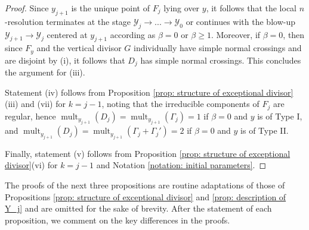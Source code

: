 \documentclass[12pt]{amsart}
\numberwithin{equation}{section}
\theoremstyle{definition}
\newcommand{\Y}{\mathcal{Y}}
\DeclareMathOperator{\mult}{mult}
\begin{document}
\begin{proof}
    Since $y_{j+1}$ is the unique point of $F_j$ lying over $y$, it follows that the local $n$-resolution terminates at the stage $\Y_j\to...\to\Y_0$ or continues with the blow-up $\Y_{j+1}\to\Y_j$ centered at $y_{j+1}$ according as $\beta=0$ or $\beta\geq 1$. Moreover, if $\beta=0$, then since $F_y$ and the vertical divisor $G$ individually have simple normal crossings and are disjoint by (i), it follows that $D_j$ has simple normal crossings. This concludes the argument for (iii).
    
    Statement (iv) follows from Proposition \ref{prop: structure of exceptional divisor}(iii) and (vii) for $k=j-1$, noting that the irreducible components of $F_j$ are regular, hence $\mult_{y_{j+1}}(D_j)=\mult_{y_{j+1}}(\Gamma_j)=1$ if $\beta=0$ and $y$ is of Type I, and $\mult_{y_{j+1}}(D_j)=\mult_{y_{j+1}}(\Gamma_j+\Gamma_j')=2$ if $\beta=0$ and $y$ is of Type II.

    Finally, statement (v) follows from Proposition \ref{prop: structure of exceptional divisor}(vi) for $k=j-1$ and Notation \ref{notation: initial parameters}.
\end{proof}

The proofs of the next three propositions are routine adaptations of those of Propositions \ref{prop: structure of exceptional divisor} and \ref{prop: description of Y_j} and are omitted for the sake of brevity. After the statement of each proposition, we comment on the key differences in the proofs.



\end{document}
